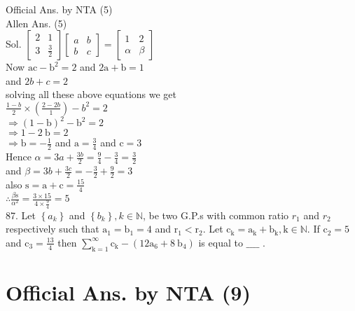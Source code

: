 \documentclass[10pt]{article}
\begin{document}
Official Ans. by NTA (5)\\
Allen Ans. (5)\\
Sol. \(\left[\begin{array}{cc}2 & 1 \\ 3 & \frac{3}{2}\end{array}\right]\left[\begin{array}{ll}a & b \\ b & c\end{array}\right]=\left[\begin{array}{cc}1 & 2 \\ \alpha & \beta\end{array}\right]\)\\
Now \(\mathrm{ac}-\mathrm{b}^{2}=2\) and \(2 \mathrm{a}+\mathrm{b}=1\)\\
and \(2 b+c=2\)\\
solving all these above equations we get\\
\(\frac{1-b}{2} \times\left(\frac{2-2 b}{1}\right)-b^{2}=2\)\\
\(\Rightarrow(1-\mathrm{b})^{2}-\mathrm{b}^{2}=2\)\\
\(\Rightarrow 1-2 \mathrm{~b}=2\)\\
\(\Rightarrow \mathrm{b}=-\frac{1}{2}\) and \(\mathrm{a}=\frac{3}{4}\) and \(\mathrm{c}=3\)\\
Hence \(\alpha=3 a+\frac{3 b}{2}=\frac{9}{4}-\frac{3}{4}=\frac{3}{2}\)\\
and \(\beta=3 b+\frac{3 c}{2}=-\frac{3}{2}+\frac{9}{2}=3\)\\
also \(\mathrm{s}=\mathrm{a}+\mathrm{c}=\frac{15}{4}\)\\
\(\therefore \frac{\beta \mathrm{s}}{\alpha^{2}}=\frac{3 \times 15}{4 \times \frac{9}{4}}=5\)\\
87. Let \(\left\{a_{k}\right\}\) and \(\left\{b_{k}\right\}, k \in \mathbb{N}\), be two G.P.s with common ratio \(r_{1}\) and \(r_{2}\) respectively such that \(\mathrm{a}_{1}=\mathrm{b}_{1}=4\) and \(\mathrm{r}_{1}<\mathrm{r}_{2}\). Let \(\mathrm{c}_{\mathrm{k}}=\mathrm{a}_{\mathrm{k}}+\mathrm{b}_{\mathrm{k}}, \mathrm{k} \in \mathbb{N}\). If \(\mathrm{c}_{2}=5\) and \(\mathrm{c}_{3}=\frac{13}{4}\) then \(\sum_{\mathrm{k}=1}^{\infty} \mathrm{c}_{\mathrm{k}}-\left(12 \mathrm{a}_{6}+8 \mathrm{~b}_{4}\right)\) is equal to \(\_\_\_\_\) .

\section*{Official Ans. by NTA (9)}
\end{document}
